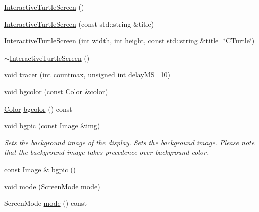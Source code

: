 \begin{DoxyCompactItemize}
\item 
\hyperlink{classcturtle_1_1InteractiveTurtleScreen_a3a2fc53b07958002992b8189a5af62f6}{Interactive\+Turtle\+Screen} ()
\item 
\hyperlink{classcturtle_1_1InteractiveTurtleScreen_ad65865be39cbe33c8614bb14f918058f}{Interactive\+Turtle\+Screen} (const std\+::string \&title)
\item 
\hyperlink{classcturtle_1_1InteractiveTurtleScreen_af9fb0672e3b17b2c07497de0b9ef99ee}{Interactive\+Turtle\+Screen} (int width, int height, const std\+::string \&title=\char`\"{}C\+Turtle\char`\"{})
\item 
\hyperlink{classcturtle_1_1InteractiveTurtleScreen_a74aecb49c64fd0035750c521d6029ccf}{$\sim$\+Interactive\+Turtle\+Screen} ()
\item 
void \hyperlink{classcturtle_1_1InteractiveTurtleScreen_ac6cbbcf714c490abb300cd6a931950f3}{tracer} (int countmax, unsigned int \hyperlink{classcturtle_1_1InteractiveTurtleScreen_a26338beec078bb1c29792cd658c1be71}{delay\+MS}=10)
\item 
void \hyperlink{classcturtle_1_1InteractiveTurtleScreen_acb5441704b45a01830d69df46a23732f}{bgcolor} (const \hyperlink{classcturtle_1_1Color}{Color} \&color)
\item 
\hyperlink{classcturtle_1_1Color}{Color} \hyperlink{classcturtle_1_1InteractiveTurtleScreen_a55289593218ba99904f7957700ef7dae}{bgcolor} () const
\item 
void \hyperlink{classcturtle_1_1InteractiveTurtleScreen_af681fbd6140ea760204fa9a1766725e3}{bgpic} (const Image \&img)
\begin{DoxyCompactList}\small\item\em Sets the background image of the display. Sets the background image. Please note that the background image takes precedence over background color. \end{DoxyCompactList}\item 
const Image \& \hyperlink{classcturtle_1_1InteractiveTurtleScreen_a38a7be849056a8450e97b15e3a02d545}{bgpic} ()
\item 
void \hyperlink{classcturtle_1_1InteractiveTurtleScreen_a1c666afe65211cf9eedaffa17206a697}{mode} (Screen\+Mode mode)
\item 
Screen\+Mode \hyperlink{classcturtle_1_1InteractiveTurtleScreen_af65c66dbfe93fa748944f7a6d299080e}{mode} () const
\item 
\mbox{\label{classcturtle_1_1InteractiveTurtleScreen_ae4e184867d7ed83c58e0ef9e730f4d73}} 

\end{DoxyCompactItemize}
